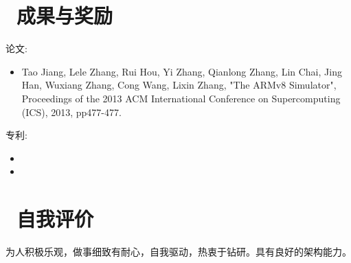 \documentclass{resume}
\begin{document}

\section{\faHeartO\ 成果与奖励}
\begin{onehalfspacing}
论文:
\begin{itemize}
  \item Tao Jiang, Lele Zhang, Rui Hou, Yi Zhang, Qianlong Zhang, Lin Chai, Jing Han, Wuxiang Zhang, Cong Wang, Lixin Zhang, "The ARMv8 Simulator", Proceedings of the 2013 ACM International Conference on Supercomputing (ICS), 2013, pp477-477.
\end{itemize}
\end{onehalfspacing}

\begin{onehalfspacing}
专利:
\begin{itemize}
 \item{}
 \item{}
\end{itemize}
\end{onehalfspacing}

\section{\faInfo\ 自我评价}
为人积极乐观，做事细致有耐心，自我驱动，热衷于钻研。具有良好的架构能力。
%
%
\end{document}
